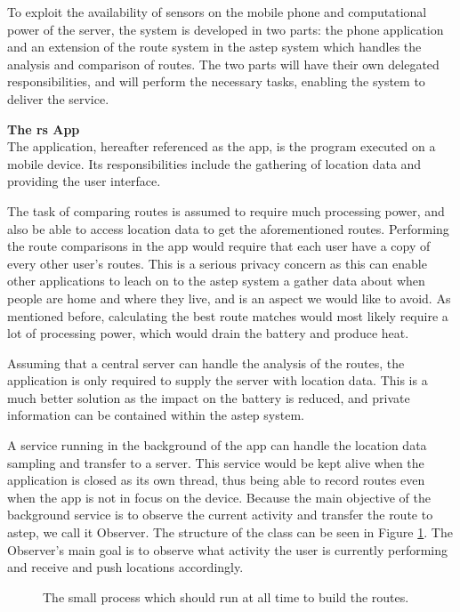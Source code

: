 To exploit the availability of sensors on the mobile phone and computational power of the server, the system is developed in two parts: the phone application and an extension of the route system in the \gls{astep} system which handles the analysis and comparison of routes.
The two parts will have their own delegated responsibilities, and will perform the necessary tasks, enabling the system to deliver the service.

\textbf{The \gls{rs} App}\\
The application, hereafter referenced as the app, is the program executed on a mobile device.
Its responsibilities include the gathering of location data and providing the user interface. 

The task of comparing routes is assumed to require much processing power, and also be able to access location data to get the aforementioned routes.
Performing the route comparisons in the app would require that each user have a copy of every other user's routes.
This is a serious privacy concern as this can enable other applications to leach on to the \gls{astep} system a gather data about when people are home and where they live, and is an aspect we would like to avoid.
As mentioned before, calculating the best route matches would most likely require a lot of processing power, which would drain the battery and produce heat.

Assuming that a central server can handle the analysis of the routes, the application is only required to supply the server with location data.
This is a much better solution as the impact on the battery is reduced, and private information can be contained within the \gls{astep} system.

A service running in the background of the app can handle the location data sampling and transfer to a server.
This service would be kept alive when the application is closed as its own thread, thus being able to record routes even when the app is not in focus on the device.
Because the main objective of the background service is to observe the current activity and transfer the route to \gls{astep}, we call it Observer.
The structure of the class can be seen in Figure \ref{fig:classDiagramSprint1Observer}.
The Observer's main goal is to observe what activity the user is currently performing and receive and push locations accordingly.

\begin{figure}[h]
	\centering
	
	\caption{The small process which should run at all time to build the routes.}
	\label{fig:classDiagramSprint1Observer}
\end{figure}

